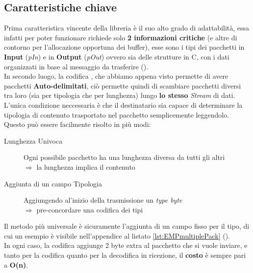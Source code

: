 \subsection{Caratteristiche chiave}
Prima caratteristica vincente della libreria è il suo alto grado di adattabilità, essa infatti per poter funzionare richiede solo \textbf{2 informazioni critiche} (e altre di contorno per l'allocazione opportuna dei buffer), esse sono i tipi dei pacchetti in \textbf{ Input} (\textit{pIn}) e in \textbf{Output} (\textit{pOut}) ovvero sia delle strutture in C, con i dati organizzati in base al messaggio da trasferire ().\\
In secondo luogo, la codifica \cite*{COBS}, che abbiamo appena visto permette di avere pacchetti \textbf{Auto-delimitati}, ciò permette quindi di scambiare pacchetti diversi tra loro (sia per tipologia che per lunghezza) lungo \textbf{lo stesso} \textit{Stream} di dati.\\
L'unica condizione neccessaria è che il destinatario sia capace di determinare la tipologia di contenuto trasportato nel pacchetto semplicemente leggendolo.\\
Questo può essere facilmente risolto in più modi:
\begin{spacing}{1.5}
	\begin{description}
		\item[Lunghezza Univoca] Ogni possibile pacchetto ha una lunghezza diversa da tutti gli altri\\
		$\Rightarrow$ la lunghezza implica il contenuto
		\item[Aggiunta di un campo Tipologia] Aggiungendo al’inizio della trasmissione un \textit{type byte}\\
		$\Rightarrow$ pre-concordare una codifica dei tipi
	\end{description}
\end{spacing}
\noindent
Il metodo più universale è sicuramente l'aggiunta di un campo fisso per il tipo, di cui un esempio è visibile nell'appendice al listato \ref{lst:EMPmultiplePack} ().\\
In ogni caso, la codifica \cite*{COBS} aggiunge 2 byte extra al pacchetto che si vuole inviare, e tanto per la codifica quanto per la decodifica in ricezione, il \textbf{costo} è sempre pari a \textbf{O(n)}.\vspace{-10mm}
